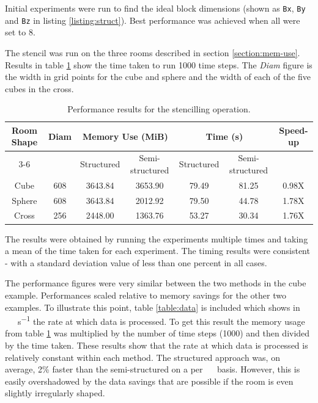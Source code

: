 \documentclass[12pt,a4paper]{report}
\begin{document}
Initial experiments were run to find the ideal block dimensions (shown as \lstinline|Bx|, \lstinline|By| and \lstinline|Bz| in listing \ref{listing:struct}). Best performance was achieved when all were set to 8. 

The stencil was run on the three rooms described in section \ref{section:mem-use}. Results in table \ref{table:perf} show the time taken to run \num{1000} time steps. The \textit{Diam} figure is the width in grid points for the cube and sphere and the width of each of the five cubes in the cross.

\begin{table}[h!]
\centering
\small
 \begin{tabular}{|c|c|c|c|c|c|c|} \hline
 Room Shape & Diam & \multicolumn{2}{c|}{Memory Use (MiB)} & \multicolumn{2}{c|}{Time (s)} & Speed-up \\ \cline{3-6}
  &  & Structured & Semi-structured & Structured & Semi-structured & \\ \hline
   
Cube & 608 & 3643.84 & 3653.90 & 79.49 & 81.25 & 0.98X \\  
Sphere & 608 & 3643.84 & 2012.92 &  79.50 & 44.78 & 1.78X \\
Cross & 256 & 2448.00 & 1363.76 & 53.27 & 30.34 & 1.76X \\  \hline
\end{tabular}
\caption{Performance results for the stencilling operation. }
\label{table:perf}
\end{table}

The results were obtained by running the experiments multiple times and taking a mean of the time taken for each experiment. The timing results were consistent - with a standard deviation value of less than one percent in all cases.

The performance figures were very similar between the two methods in the cube example. Performances scaled relative to memory savings for the other two examples. To illustrate this point, table \ref{table:data} is included which shows in \SI{}{\gibi\byte\per\second} the rate at which data is processed. To get this result the memory usage from table \ref{table:perf} was multiplied by the number of time steps (\num{1000}) and then divided by the time taken. These results show that the rate at which data is processed is relatively constant within each method. The structured approach was, on average, \num{2}\% faster than the semi-structured on  a per \SI{}{\gibi\byte} basis. However, this is easily overshadowed by the data savings that are possible if the room is even slightly irregularly shaped.
\end{document}
